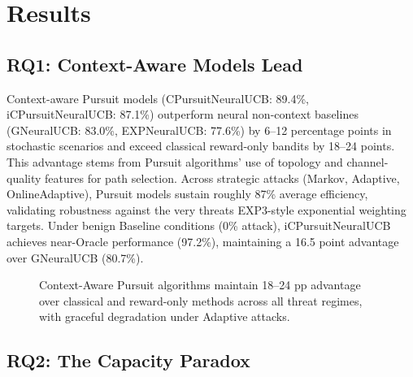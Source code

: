 \documentclass[11pt,a4paper]{article}
\begin{document}
\section{Results}
\label{sec:results}

\subsection{RQ1: Context-Aware Models Lead}

Context-aware Pursuit models (CPursuitNeuralUCB: 89.4\%, iCPursuitNeuralUCB: 87.1\%) outperform neural non-context baselines (GNeuralUCB: 83.0\%, EXPNeuralUCB: 77.6\%) by 6--12 percentage points in stochastic scenarios and exceed classical reward-only bandits by 18--24 points. This advantage stems from Pursuit algorithms' use of topology and channel-quality features for path selection. Across strategic attacks (Markov, Adaptive, OnlineAdaptive), Pursuit models sustain roughly 87\% average efficiency, validating robustness against the very threats EXP3-style exponential weighting targets. Under benign Baseline conditions (0\% attack), iCPursuitNeuralUCB achieves near-Oracle performance (97.2\%), maintaining a 16.5 point advantage over GNeuralUCB (80.7\%).

\begin{figure}[tb]
\centering
{}
\caption{Context-Aware Pursuit algorithms maintain 18--24 pp advantage over classical and reward-only methods across all threat regimes, with graceful degradation under Adaptive attacks.}
\label{fig:context_comparison}
\end{figure}

\subsection{RQ2: The Capacity Paradox}
\end{document}

